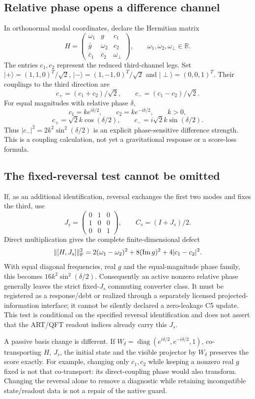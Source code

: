 \documentclass[11pt,a4paper]{article}
\begin{document}
\subsection{Relative phase opens a difference channel}
In orthonormal modal coordinates, declare the Hermitian matrix
\[
 H=\begin{pmatrix}
 \omega_1&g&c_1\\
 \bar g&\omega_2&c_2\\
 \bar c_1&\bar c_2&\omega_\perp
 \end{pmatrix},\qquad \omega_1,\omega_2,\omega_\perp\in\mathbb R.
\]
The entries $c_1,c_2$ represent the reduced third-channel legs.
Set $|+\rangle=(1,1,0)^T/\sqrt2$,
$|-\rangle=(1,-1,0)^T/\sqrt2$ and
$|\perp\rangle=(0,0,1)^T$. Their couplings to the third direction are
\[
 c_+=(c_1+c_2)/\sqrt2,\qquad
 c_-=(c_1-c_2)/\sqrt2.
\]
For equal magnitudes with relative phase $\delta$,
\[
 c_1=k e^{i\delta/2},\qquad c_2=k e^{-i\delta/2},\qquad k>0,
\]
\[
 c_+=\sqrt2 k\cos(\delta/2),\qquad
 c_-=i\sqrt2 k\sin(\delta/2).
\]
Thus $|c_-|^2=2k^2\sin^2(\delta/2)$ is an explicit phase-sensitive
difference strength. This is a coupling calculation, not yet a
gravitational response or a score-loss formula.

\subsection{The fixed-reversal test cannot be omitted}
If, as an additional identification, reversal exchanges the first
two modes and fixes the third, use
\[
 J_s=\begin{pmatrix}0&1&0\\1&0&0\\0&0&1\end{pmatrix},
 \qquad C_s=(I+J_s)/2.
\]
Direct multiplication gives the complete finite-dimensional defect
\[
 \|[H,J_s]\|_{\rm F}^2
 =2(\omega_1-\omega_2)^2
 +8(\operatorname{Im}g)^2+4|c_1-c_2|^2.
\]
With equal diagonal frequencies, real $g$ and the equal-magnitude
phase family, this becomes $16k^2\sin^2(\delta/2)$.
Consequently an active nonzero relative phase generally leaves
the strict fixed-$J_s$ commuting converter class. It must be
registered as a response/debt or realized through a separately
licensed projected-information interface; it cannot be silently
declared a zero-leakage C5 update. This test is conditional on
the specified reversal identification and does not assert that
the ART/QFT readout indices already carry this $J_s$.

A passive basis change is different. If
$W_\delta=\operatorname{diag}(e^{i\delta/2},e^{-i\delta/2},1)$,
co-transporting $H$, $J_s$, the initial state and the visible
projector by $W_\delta$ preserves the score exactly. For example,
changing only $c_1,c_2$ while keeping a nonzero real $g$ fixed is
not that co-transport: its direct-coupling phase would also transform.
Changing the reversal alone to remove a diagnostic while retaining
incompatible state/readout data is not a repair of the native guard.
\end{document}
